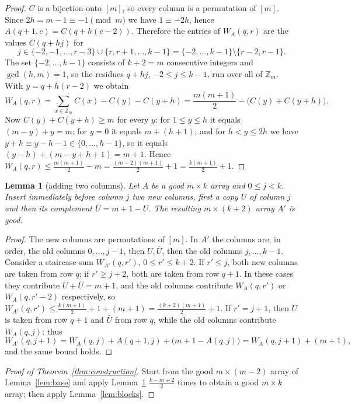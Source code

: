 \documentclass[11pt]{amsart}
\newtheorem{lemma}[theorem]{Lemma}
\theoremstyle{remark}
\newcommand{\Z}{\mathbb{Z}}
\begin{document}
\begin{proof}
$C$ is a bijection onto $[m]$, so every column is a permutation of $[m]$. Since $2h=m-1\equiv-1\pmod m$ we have
$1\equiv-2h$, hence $A(q+1,c)=C(q+h(c-2))$. Therefore the entries of $W_A(q,r)$ are the values $C(q+hj)$ for
\[
  j\in\{-2,-1,\dots,r-3\}\cup\{r,r+1,\dots,k-1\}=\{-2,\dots,k-1\}\setminus\{r-2,r-1\}.
\]
The set $\{-2,\dots,k-1\}$ consists of $k+2=m$ consecutive integers and $\gcd(h,m)=1$, so the residues $q+hj$,
$-2\le j\le k-1$, run over all of $\Z_m$. With $y=q+h(r-2)$ we obtain
\[
  W_A(q,r)=\sum_{x\in\Z_m}C(x)-C(y)-C(y+h)=\frac{m(m+1)}{2}-\bigl(C(y)+C(y+h)\bigr).
\]
Now $C(y)+C(y+h)\ge m$ for every $y$: for $1\le y\le h$ it equals $(m-y)+y=m$; for $y=0$ it equals $m+(h+1)$; and for
$h<y\le 2h$ we have $y+h\equiv y-h-1\in\{0,\dots,h-1\}$, so it equals $(y-h)+(m-y+h+1)=m+1$. Hence
$W_A(q,r)\le\frac{m(m+1)}{2}-m=\frac{(m-2)(m+1)}{2}+1=\frac{k(m+1)}{2}+1$.
\end{proof}

\begin{lemma}[adding two columns]\label{lem:insert}
Let $A$ be a good $m\times k$ array and $0\le j<k$. Insert immediately before column $j$ two new columns, first a
copy $U$ of column $j$ and then its complement $\bar U=m+1-U$. The resulting $m\times(k+2)$ array $A'$ is good.
\end{lemma}

\begin{proof}
The new columns are permutations of $[m]$. In $A'$ the columns are, in order, the old columns $0,\dots,j-1$, then
$U,\bar U$, then the old columns $j,\dots,k-1$. Consider a staircase sum $W_{A'}(q,r')$, $0\le r'\le k+2$.
If $r'\le j$, both new columns are taken from row $q$; if $r'\ge j+2$, both are taken from row $q+1$. In these cases
they contribute $U+\bar U=m+1$, and the old columns contribute $W_A(q,r')$ or $W_A(q,r'-2)$ respectively, so
$W_{A'}(q,r')\le\frac{k(m+1)}2+1+(m+1)=\frac{(k+2)(m+1)}2+1$. If $r'=j+1$, then $U$ is taken from row $q+1$ and
$\bar U$ from row $q$, while the old columns contribute $W_A(q,j)$; thus
\[
  W_{A'}(q,j+1)=W_A(q,j)+A(q+1,j)+\bigl(m+1-A(q,j)\bigr)=W_A(q,j+1)+(m+1),
\]
and the same bound holds.
\end{proof}

\begin{proof}[Proof of Theorem~\ref{thm:construction}]
Start from the good $m\times(m-2)$ array of Lemma~\ref{lem:base} and apply Lemma~\ref{lem:insert}
$\frac{k-m+2}{2}$ times to obtain a good $m\times k$ array; then apply Lemma~\ref{lem:blocks}.
\end{proof}
\end{document}
